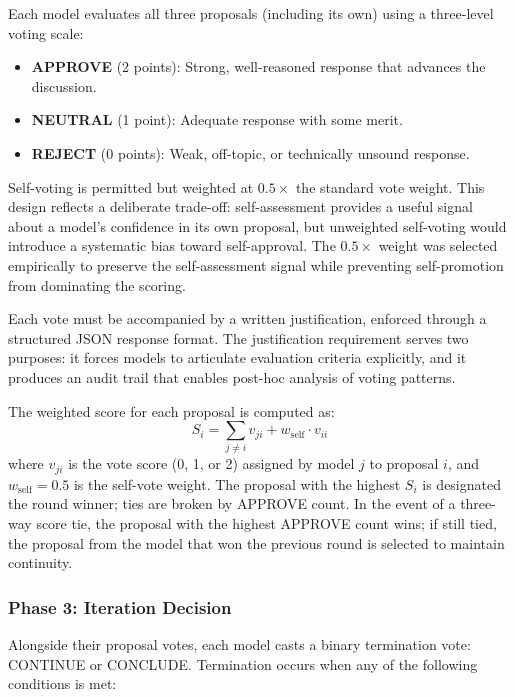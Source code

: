\documentclass[11pt,a4paper]{article}
\begin{document}
Each model evaluates all three proposals (including its own) using a three-level voting scale:

\begin{itemize}[nosep]
    \item \textbf{APPROVE} (2 points): Strong, well-reasoned response that advances the discussion.
    \item \textbf{NEUTRAL} (1 point): Adequate response with some merit.
    \item \textbf{REJECT} (0 points): Weak, off-topic, or technically unsound response.
\end{itemize}

Self-voting is permitted but weighted at $0.5\times$ the standard vote weight. This design reflects a deliberate trade-off: self-assessment provides a useful signal about a model's confidence in its own proposal, but unweighted self-voting would introduce a systematic bias toward self-approval. The $0.5\times$ weight was selected empirically to preserve the self-assessment signal while preventing self-promotion from dominating the scoring.

Each vote must be accompanied by a written justification, enforced through a structured JSON response format. The justification requirement serves two purposes: it forces models to articulate evaluation criteria explicitly, and it produces an audit trail that enables post-hoc analysis of voting patterns.

The weighted score for each proposal is computed as:
\begin{equation}
    S_i = \sum_{j \neq i} v_{ji} + w_{\text{self}} \cdot v_{ii}
    \label{eq:score}
\end{equation}
where $v_{ji}$ is the vote score (0, 1, or 2) assigned by model $j$ to proposal $i$, and $w_{\text{self}} = 0.5$ is the self-vote weight. The proposal with the highest $S_i$ is designated the round winner; ties are broken by APPROVE count. In the event of a three-way score tie, the proposal with the highest APPROVE count wins; if still tied, the proposal from the model that won the previous round is selected to maintain continuity.

\subsubsection{Phase 3: Iteration Decision}

Alongside their proposal votes, each model casts a binary termination vote: CONTINUE or CONCLUDE. Termination occurs when any of the following conditions is met:
\end{document}
